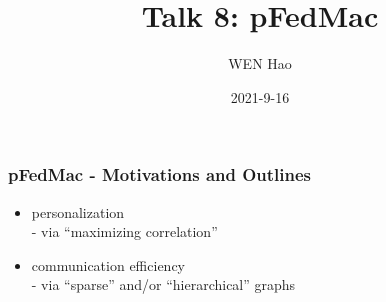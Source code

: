\usepackage{nccmath}




\title[pFedMac]{Talk 8: pFedMac}
\date{2021-9-16}
\author[]{WEN Hao}




\setlength{\belowdisplayskip}{5pt} \setlength{\belowdisplayshortskip}{5pt}
\setlength{\abovedisplayskip}{5pt} \setlength{\abovedisplayshortskip}{5pt}


\begin{frame}
\titlepage %
\end{frame}


\begin{frame}
\frametitle{pFedMac - Motivations and Outlines}

{\large
\begin{itemize}
    \item personalization \\
    - via ``maximizing correlation''
    \vspace{1em}
    \item communication efficiency \\
    - via ``sparse'' and/or ``hierarchical'' graphs
\end{itemize}
}


\end{frame}


